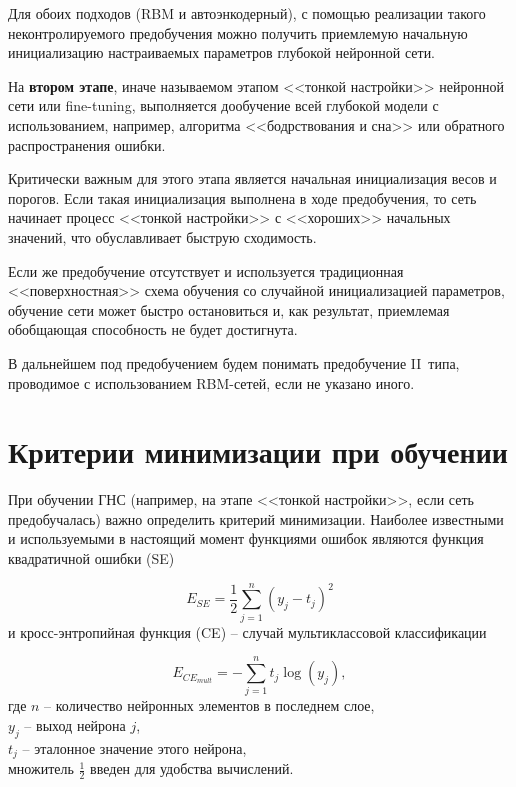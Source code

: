 Для обоих подходов (RBM и автоэнкодерный), с помощью реализации такого неконтролируемого предобучения можно получить приемлемую начальную инициализацию настраиваемых параметров глубокой нейронной сети. 

На \textbf{втором этапе}, иначе называемом этапом <<тонкой настройки>> нейронной сети или fine-tuning, выполняется дообучение всей глубокой модели с использованием, например, алгоритма <<бодрствования и сна>> или обратного распространения ошибки.

Критически важным для этого этапа является начальная инициализация весов и порогов. Если такая инициализация выполнена в ходе предобучения, то сеть начинает процесс <<тонкой настройки>> с <<хороших>> начальных значений, что обуславливает быструю сходимость.

Если же предобучение отсутствует и используется традиционная <<поверхностная>> схема обучения со случайной инициализацией параметров, обучение сети может быстро остановиться и, как результат, приемлемая обобщающая способность не будет достигнута.

В дальнейшем под предобучением будем понимать предобучение II~типа, проводимое с использованием RBM-сетей, если не указано иного. 

\section{Критерии минимизации при обучении}

При обучении ГНС (например, на этапе <<тонкой настройки>>, если сеть предобучалась) важно определить критерий минимизации. Наиболее известными и используемыми в настоящий момент функциями ошибок являются функция квадратичной ошибки (SE)

\begin{equation}
	\label{MSE}
	E_{SE} = \frac{1}{2}\sum_{j=1}^{n}(y_j - t_j)^2
\end{equation}
и кросс-энтропийная функция (CE) -- случай мультиклассовой классификации

\begin{equation}
	\label{CE_multiclass}
	E_{CE_{mult}} = -\sum_{j=1}^{n}t_j\log(y_j),
\end{equation}
где $n$ -- количество нейронных элементов в последнем слое,\\
$y_j$ -- выход нейрона $j$,\\
$t_j$ -- эталонное значение этого нейрона,\\
множитель $\frac{1}{2}$ введен для удобства вычислений.

